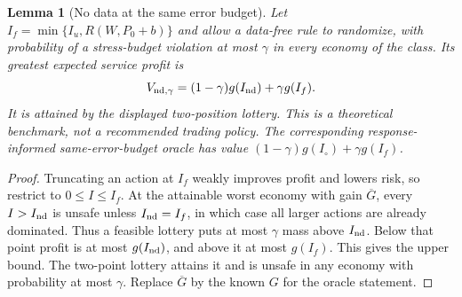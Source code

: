 \documentclass[12pt]{article}
\newtheorem{lemma}[theorem]{Lemma}
\theoremstyle{definition}
\theoremstyle{remark}
\begin{document}
\begin{lemma}[No data at the same error budget]\label{fhc:nodata-chance}
Let $I_f=\min\{I_u,R(W,P_0+b)\}$ and allow a data-free rule to randomize,
with probability of a stress-budget violation at most $\gamma$ in every
economy of the class. Its greatest expected service profit is
\[
 V_{{\rm nd},\gamma}=(1-\gamma)g(I_{\rm nd})+\gamma g(I_f).
\]
It is attained by the displayed two-position lottery. This is a theoretical
benchmark, not a recommended trading policy. The corresponding response-
informed same-error-budget oracle has value
$(1-\gamma)g(I_\circ)+\gamma g(I_f)$.
\end{lemma}

\begin{proof}
Truncating an action at $I_f$ weakly improves profit and lowers risk, so
restrict to $0\le I\le I_f$. At the attainable worst economy with gain
$\overline G$, every $I>I_{\rm nd}$ is unsafe unless $I_{\rm nd}=I_f$,
in which case all larger actions are already dominated. Thus a feasible
lottery puts at most $\gamma$ mass above $I_{\rm nd}$. Below that point
profit is at most $g(I_{\rm nd})$, and above it at most $g(I_f)$.
This gives the upper bound. The two-point lottery attains it and is unsafe
in any economy with probability at most $\gamma$. Replace $\overline G$
by the known $G$ for the oracle statement.
\end{proof}
\end{document}
